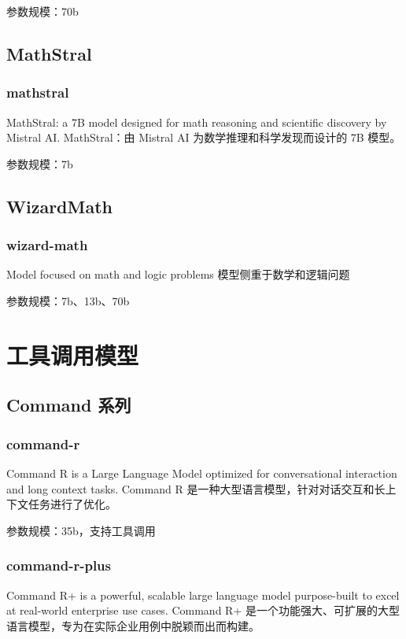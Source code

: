 \documentclass[12pt,UTF8]{ctexbook}
\begin{document}
参数规模：70b

\section{MathStral}

\subsection{mathstral}

MathStral: a 7B model designed for math reasoning and scientific discovery by Mistral AI.
MathStral：由 Mistral AI 为数学推理和科学发现而设计的 7B 模型。

参数规模：7b

\section{WizardMath}

\subsection{wizard-math}

Model focused on math and logic problems
模型侧重于数学和逻辑问题

参数规模：7b、13b、70b

\chapter{工具调用模型}

\section{Command 系列}

\subsection{command-r}

Command R is a Large Language Model optimized for conversational interaction and long context tasks.
Command R 是一种大型语言模型，针对对话交互和长上下文任务进行了优化。

参数规模：35b，支持工具调用

\subsection{command-r-plus}

Command R+ is a powerful, scalable large language model purpose-built to excel at real-world enterprise use cases.
Command R+ 是一个功能强大、可扩展的大型语言模型，专为在实际企业用例中脱颖而出而构建。
\end{document}
